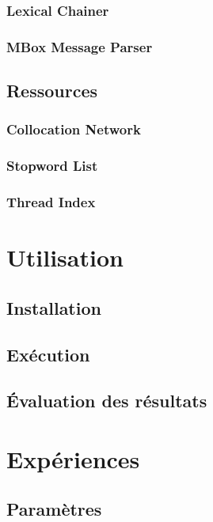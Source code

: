 \documentclass[a4paper]{article}
\begin{document}
	\subsubsection{Lexical Chainer}

	\subsubsection{MBox Message Parser}

\subsection{Ressources}

	\subsubsection{Collocation Network}

	\subsubsection{Stopword List}

	\subsubsection{Thread Index}

\section{Utilisation}

	\subsection{Installation}

	\subsection{Exécution}

	\subsection{Évaluation des résultats}

\section{Expériences}

	\subsection{Paramètres}
\end{document}
